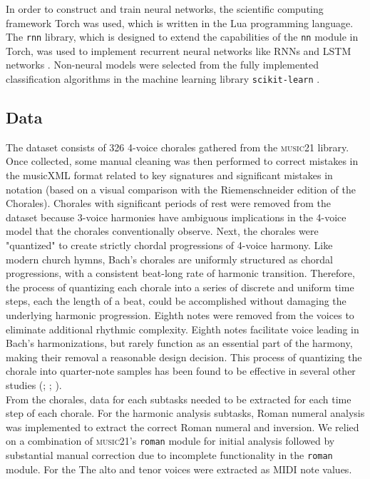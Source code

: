 \documentclass[11pt]{article}
\begin{document}
In order to construct and train neural networks, the scientific computing framework Torch was used, which is written in the Lua programming language. The \texttt{rnn} library, which is designed to extend the capabilities of the \texttt{nn} module in Torch, was used to implement recurrent neural networks like RNNs and LSTM networks \citep{leonard2015rnn}. Non-neural models were selected from the fully implemented classification algorithms in the machine learning library \texttt{scikit-learn} \citep{scikit-learn}.

\subsection{Data}

The dataset consists of 326 4-voice chorales gathered from the \textsc{music21} library. Once collected, some manual cleaning was then performed to correct mistakes in the musicXML format related to key signatures and significant mistakes in notation (based on a visual comparison with the Riemenschneider edition of the Chorales). Chorales with significant periods of rest were removed from the dataset because 3-voice harmonies have ambiguous implications in the 4-voice model that the chorales conventionally observe. Next, the chorales were "quantized" to create strictly chordal progressions of 4-voice harmony. Like modern church hymns, Bach's chorales are uniformly structured as chordal progressions, with a consistent beat-long rate of harmonic transition. Therefore, the process of quantizing each chorale into a series of discrete and uniform time steps, each the length of a beat, could be accomplished without damaging the underlying harmonic progression. Eighth notes were removed from the voices to eliminate additional rhythmic complexity. Eighth notes facilitate voice leading in Bach's harmonizations, but rarely function as an essential part of the harmony, making their removal a reasonable design decision. This process of quantizing the chorale into quarter-note samples has been found to be effective in several other studies (\cite{hild1992harmonet}; \cite{madsen2002}; \cite{kaliakatsos2014}). \\

From the chorales, data for each subtasks needed to be extracted for each time step of each chorale. For the harmonic analysis subtasks, Roman numeral analysis was implemented to extract the correct Roman numeral and inversion. We relied on a combination of \textsc{music21}'s \texttt{roman} module for initial analysis followed by substantial manual correction due to incomplete functionality in the \texttt{roman} module. For the The alto and tenor voices were extracted as MIDI note values. \\
\end{document}
